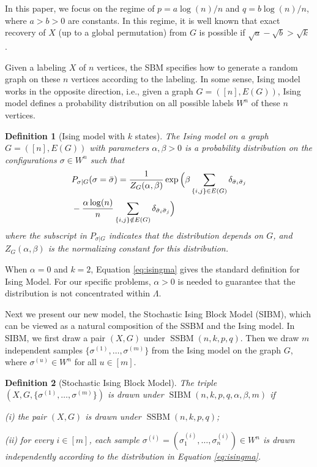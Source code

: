 \label{key}\documentclass[conference]{IEEEtran}
\newtheorem{definition}{Definition}%
\DeclareMathOperator{\SSBM}{SSBM}
\DeclareMathOperator{\SIBM}{SIBM}
\newcommand{\ide}[2]{ \delta_{#1 #2} }
\begin{document}
In this paper, we focus on the regime of $p=a\log(n)/n$ and $q=b\log(n)/n$, where $a>b> 0$ are constants. In this regime, it is well known that exact recovery of $X$ (up to a global permutation) from $G$ is possible if $\sqrt{a}-\sqrt{b} > \sqrt{k}$ \cite{abbe2015exact}.
 
Given a labeling $X$ of $n$ vertices, the SBM specifies how to generate a random graph on these $n$ vertices according to the labeling. In some sense, Ising model works in the opposite direction, i.e., given a graph $G=([n],E(G))$, Ising model defines a probability distribution on all possible labels $W^n$ of these $n$ vertices. 

 
\begin{definition}[Ising model with $k$ states]
The Ising model on a graph $G=([n],E(G))$ with parameters $\alpha,\beta>0$ is a probability distribution on the configurations $\sigma\in W^n$ such that
\begin{align} \label{eq:isingma}
&P_{\sigma|G}(\sigma=\bar{\sigma})=\frac{1}{Z_G(\alpha,\beta)}
\exp\Big(\beta \sum_{\{i,j\}\in E(G)} \ide{\bar{\sigma}_i}{\bar{\sigma}_j}\notag\\
&-\frac{\alpha\log(n)}{n} \sum_{\{i,j\}\notin E(G)} \ide{\bar{\sigma}_i}{\bar{\sigma}_j}
\Big)
\end{align}
where the subscript in $P_{\sigma|G}$ indicates that the distribution depends on $G$, and
$Z_G(\alpha,\beta)$ is the normalizing constant for this distribution.
\end{definition}

When $\alpha=0$ and $k=2$, Equation \eqref{eq:isingma} gives the standard definition for Ising Model.
For our specific problems, $\alpha > 0$ is needed to guarantee that the distribution is not concentrated within
$\Lambda$. 


Next we present our new model, the Stochastic Ising Block Model (SIBM), which can be viewed as a natural composition of the SSBM and the Ising model. In SIBM, we first draw a pair $(X,G)$ under $\SSBM(n,k,p,q)$.  Then we draw $m$ independent samples $\{\sigma^{(1)},\dots,\sigma^{(m)}\}$ from the Ising model on the graph $G$, where $\sigma^{(u)}\in W^n$ for all $u\in[m]$.

\begin{definition}[Stochastic Ising Block Model]
The triple $(X,G,\{\sigma^{(1)},\dots,\sigma^{(m)}\})$ is drawn under $\SIBM(n,k, p,q,\alpha,\beta,m)$ if

\noindent
(i) the pair $(X,G)$ is drawn under $\SSBM(n,k, p,q)$;

\noindent
(ii) for every $i\in[m]$, each sample $\sigma^{(i)}=(\sigma_1^{(i)},\dots,\sigma_n^{(i)}) \in W^n$ is drawn independently according to the distribution in Equation \eqref{eq:isingma}.
\end{definition}
\end{document}
